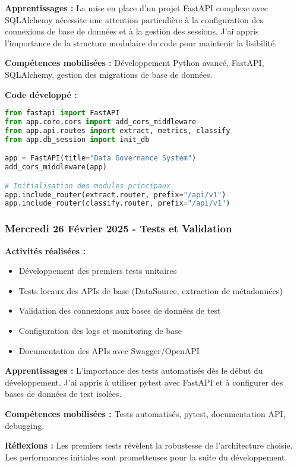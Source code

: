 \textbf{Apprentissages :}
La mise en place d'un projet FastAPI complexe avec SQLAlchemy nécessite une attention particulière à la configuration des connexions de base de données et à la gestion des sessions. J'ai appris l'importance de la structure modulaire du code pour maintenir la lisibilité.

\textbf{Compétences mobilisées :}
Développement Python avancé, FastAPI, SQLAlchemy, gestion des migrations de base de données.

\textbf{Code développé :}
\begin{lstlisting}[language=Python, caption=Structure initiale main.py]
from fastapi import FastAPI
from app.core.cors import add_cors_middleware
from app.api.routes import extract, metrics, classify
from app.db_session import init_db

app = FastAPI(title="Data Governance System")
add_cors_middleware(app)

# Initialisation des modules principaux
app.include_router(extract.router, prefix="/api/v1")
app.include_router(classify.router, prefix="/api/v1")
\end{lstlisting}

\subsubsection{Mercredi 26 Février 2025 - Tests et Validation}

\textbf{Activités réalisées :}
\begin{itemize}
    \item Développement des premiers tests unitaires
    \item Tests locaux des APIs de base (DataSource, extraction de métadonnées)
    \item Validation des connexions aux bases de données de test
    \item Configuration des logs et monitoring de base
    \item Documentation des APIs avec Swagger/OpenAPI
\end{itemize}

\textbf{Apprentissages :}
L'importance des tests automatisés dès le début du développement. J'ai appris à utiliser pytest avec FastAPI et à configurer des bases de données de test isolées.

\textbf{Compétences mobilisées :}
Tests automatisés, pytest, documentation API, debugging.

\textbf{Réflexions :}
Les premiers tests révèlent la robustesse de l'architecture choisie. Les performances initiales sont prometteuses pour la suite du développement.

